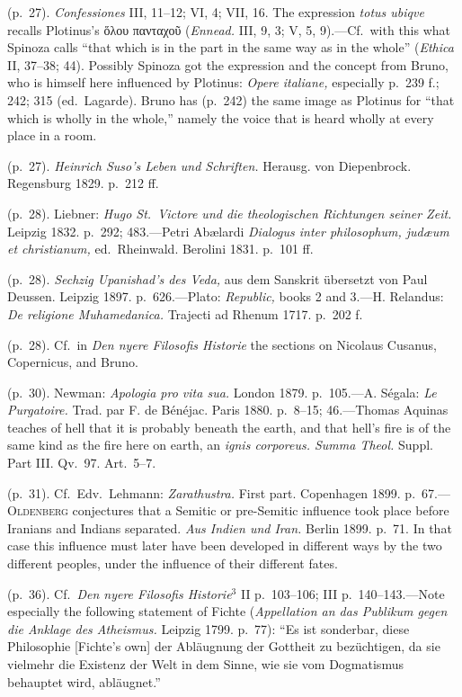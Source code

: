 \documentclass[12pt,a4paper]{book}
\newcommand{\opage}[1]{\marginnote{\footnotesize\textit{[#1]}}}
\begin{document}
 (p.~27). \emph{Confessiones} III, 11--12; VI, 4; VII, 16. The expression \emph{totus ubiqve}
recalls Plotinus's ὅλου πανταχοῦ (\emph{Ennead.} III, 9, 3; V, 5, 9).---Cf.\ with this what
Spinoza calls ``that which is in the part in the same way as in the whole'' (\emph{Ethica} II,
37--38; 44). Possibly Spinoza got the expression and the concept from Bruno, who is himself
here influenced by Plotinus: \emph{Opere italiane,} especially p.~239 f.; 242; 315 (ed.\
Lagarde). Bruno has (p.~242) the same image as Plotinus for ``that which is wholly in the
whole,'' namely the voice that is heard wholly at every place in a room.

 (p.~27). \emph{Heinrich Suso's Leben und Schriften.} Herausg. von Diepenbrock. Regensburg 1829.
p.~212 ff.

 (p.~28). Liebner: \emph{Hugo St.\ Victore und die theologischen Richtungen seiner Zeit.} Leipzig
1832. p.~292; 483.---Petri Abælardi \emph{Dialogus inter philosophum, judæum et christianum,}
ed.\ Rheinwald. Berolini 1831. p.~101 ff.

 (p.~28). \emph{Sechzig Upanishad's des Veda,} aus dem Sanskrit übersetzt von Paul Deussen.
Leipzig 1897. p.~626.---Plato: \emph{Republic,} books 2 and 3.---H. Relandus: \emph{De
religione Muhamedanica.} Trajecti ad Rhenum 1717. p.~202 f.

 (p.~28). Cf.\ in \emph{Den nyere Filosofis Historie} the sections on Nicolaus Cusanus,
Copernicus, and Bruno.

 (p.~30). Newman: \emph{Apologia pro vita sua.} London 1879. p.~105.---A. Ségala: \emph{Le
Purgatoire.} Trad. par F. de Bénéjac. Paris 1880. p.~8--15; 46.---Thomas Aquinas teaches of hell
that it is probably beneath the earth, and that hell's fire is of the same kind as the fire here
on earth, an \emph{ignis corporeus. Summa Theol.} Suppl. Part III. Qv.~97. Art.~5--7.

 (p.~31). Cf.\ Edv.\ Lehmann: \emph{Zarathustra.} First part. Copenhagen 1899. p.~67.---%
\textsc{Oldenberg} conjectures that a Semitic or pre-Semitic influence took place before Iranians
and Indians separated. \emph{Aus Indien und Iran.} Berlin 1899. p.~71. In that case this influence
must later have been developed in different ways by the two different peoples, under the influence
of their different fates.

\opage{247}(p.~36). Cf.\ \emph{Den nyere Filosofis Historie}$^3$ II p.~103--106; III p.~140--143.---Note
especially the following statement of Fichte (\emph{Appellation an das Publikum gegen die Anklage
des Atheismus.} Leipzig 1799. p.~77): ``Es ist sonderbar, diese Philosophie [Fichte's own] der
Abläugnung der Gottheit zu bezüchtigen, da sie vielmehr die Existenz der Welt in dem Sinne, wie
sie vom Dogmatismus behauptet wird, abläugnet.''
\end{document}
